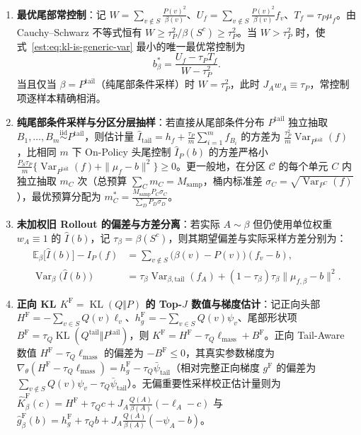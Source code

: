 \documentclass[lang=cn,scheme=chinese,openany]{elegantbook}
\newcommand{\E}{\mathbb E}
\newcommand{\KL}{\operatorname{KL}}
\newcommand{\Var}{\operatorname{Var}}
\newcommand{\tail}{\mathrm{tail}}
\begin{document}
\begin{proposition}[任意采样测度下的最优尾部常控制与分层尾部采样]
\label{est:thm:kl-importance}
\begin{enumerate}
\item \textbf{最优尾部常控制}：记 $W=\sum_{v\notin S}\frac{P(v)^2}{\beta(v)}$、$U_f=\sum_{v\notin S}\frac{P(v)^2}{\beta(v)}f_v$、$T_f=\tau_P\mu_f$。由 Cauchy--Schwarz 不等式恒有 $W\ge\tau_P^2/\beta(S^c)\ge\tau_P^2$。当 $W>\tau_P^2$ 时，使式~\eqref{est:eq:kl-is-generic-var} 最小的唯一最优常控制为
\begin{equation*}
 b_\beta^*=\frac{U_f-\tau_P T_f}{W-\tau_P^2}.
\end{equation*}
当且仅当 $\beta=P^{\tail}$（纯尾部条件采样）时 $W=\tau_P^2$，此时 $J_A w_A\equiv\tau_P$，常控制项逐样本精确相消。
\item \textbf{纯尾部条件采样与分区分层抽样}：若直接从尾部条件分布 $P^{\tail}$ 独立抽取 $B_1,\ldots,B_m\overset{\mathrm{iid}}\sim P^{\tail}$，则估计量 $\widehat I_\tail=h_f+\frac{\tau_P}{m}\sum_{i=1}^m f_{B_i}$ 的方差为 $\frac{\tau_P^2}{m}\Var_{P^{\tail}}(f)$，比相同 $m$ 下 On-Policy 头尾控制 $\widehat I_P(b)$ 的方差严格小 $\frac{P_S\tau_P}{m}\{\Var_{P^{\tail}}(f)+\|\mu_f-b\|^2\}\ge 0$。更一般地，在分区 $\mathcal C$ 的每个单元 $C$ 内独立抽取 $m_C$ 次（总预算 $\sum_C m_C=M_{\mathrm{samp}}$，桶内标准差 $\sigma_C=\sqrt{\Var_{P^C}(f)}$），最优预算分配为 $m_C^*=\frac{M_{\mathrm{samp}}P_C\sigma_C}{\sum_D P_D\sigma_D}$。
\item \textbf{未加权旧 Rollout 的偏差与方差分离}：若实际 $A\sim\beta$ 但仍使用单位权重 $w_A\equiv 1$ 的 $\widehat I(b)$，记 $\tau_\beta=\beta(S^c)$，则其期望偏差与实际采样方差分别为：
\begin{align}
 \E_\beta\bigl[\widehat I(b)\bigr]-I_P(f)
 &=\sum_{v\notin S}\bigl(\beta(v)-P(v)\bigr)(f_v-b),
 \label{est:eq:kl-wrong-measure-bias}\\
 \Var_\beta\bigl(\widehat I(b)\bigr)
 &=\tau_\beta\Var_{\beta,\tail}(f_A)
 +(1-\tau_\beta)\tau_\beta\|\mu_{f,\beta}-b\|^2.
 \label{est:eq:kl-wrong-measure-var}
\end{align}
\item \textbf{正向 KL $K^{\mathrm F}=\KL(Q\Vert P)$ 的 Top-$J$ 数值与梯度估计}：记正向头部 $H^{\mathrm F}=-\sum_{v\in S}Q(v)\ell_v$、$h_g^{\mathrm F}=-\sum_{v\in S}Q(v)\psi_v$、尾部形状项 $B^{\mathrm F}=\tau_Q\KL(Q^{\tail}\Vert P^{\tail})$，则 $K^{\mathrm F}=H^{\mathrm F}-\tau_Q\ell_{\mathrm{mass}}+B^{\mathrm F}$。正向 Tail-Aware 数值 $H^{\mathrm F}-\tau_Q\ell_{\mathrm{mass}}$ 的偏差为 $-B^{\mathrm F}\le 0$，其真实参数梯度为 $\nabla_\theta(H^{\mathrm F}-\tau_Q\ell_{\mathrm{mass}})=h_g^{\mathrm F}-\tau_Q\bar\psi_\tail$（相对完整正向梯度 $g^{\mathrm F}$ 的偏差为 $\sum_{v\notin S}Q(v)\psi_v-\tau_Q\bar\psi_\tail$）。无偏重要性采样校正估计量则为 $\widehat K^{\mathrm F}_\beta(c)=H^{\mathrm F}+\tau_Q c+J_A\frac{Q(A)}{\beta(A)}(-\ell_A-c)$ 与 $\widehat g^{\mathrm F}_\beta(b)=h_g^{\mathrm F}+\tau_Q b+J_A\frac{Q(A)}{\beta(A)}(-\psi_A-b)$。
\end{enumerate}
\end{proposition}
\end{document}
